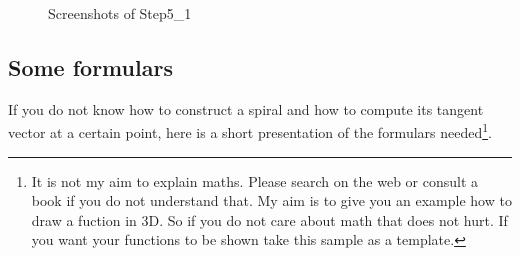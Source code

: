 \begin{figure}[htbp]
  \centering

  \vspace{0.3cm} %

 \vspace{0.3cm}
  \caption[Screenshots of Step5\_1]{Screenshots of Step5\_1}
  \label{STEP_5_1_SCREEN}
\end{figure}

\subsection{Some formulars}
If you do not know how to construct a spiral and how to compute its tangent vector at a certain point, here is a short presentation of the formulars needed\footnote{It is not my aim to explain maths. Please search on the web or consult a book if you do not understand that. My aim is to give you an example how to draw a fuction in 3D. So if you do not care about math that does not hurt. If you want your functions to be shown take this sample as a template.}.

